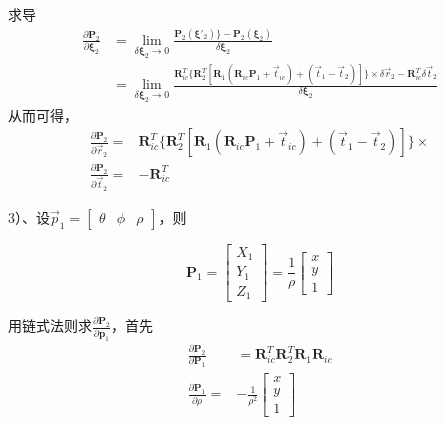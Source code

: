 \documentclass{article}
\begin{document}
求导
\begin{equation}
	\begin{aligned}
		\frac{\partial{\boldsymbol{P}_2}}{\partial{\boldsymbol{\xi}_2}} & = 
		\lim_{\delta\boldsymbol{\xi}_2\rightarrow0}\frac{\boldsymbol{P}_2(\boldsymbol{\xi}'_2)\}-  \boldsymbol{P}_2(\boldsymbol{\xi}_2)}{\delta\boldsymbol{\xi}_2}\\&=
		\lim_{\delta\boldsymbol{\xi}_2\rightarrow0}\frac{\boldsymbol{R}_{ic}^{T}\{\boldsymbol{R}_2^{T}[\boldsymbol{R}_1(\boldsymbol{R}_{ic}\boldsymbol{P}_1+\vec{t}_{ic})+(\vec{t}_1-\vec{t}_2)]\}\times\delta\vec{r}_2 - \boldsymbol{R}_{ic}^{T}\delta\vec{t}_2}{\delta\boldsymbol{\xi}_2}
	\end{aligned}
\end{equation}
从而可得，
\begin{equation}
	\begin{aligned}
		\frac{\partial{\boldsymbol{P}_2}}{\partial{\vec{r}_2}}= & \boldsymbol{R}_{ic}^{T}\{\boldsymbol{R}_2^{T}[\boldsymbol{R}_1(\boldsymbol{R}_{ic}\boldsymbol{P}_1+\vec{t}_{ic})+(\vec{t}_1-\vec{t}_2)]\}\times \\
		\frac{\partial{\boldsymbol{P}_2}}{\partial{\vec{t}_2}}= & -\boldsymbol{R}_{ic}^{T}                                                                                                                        
	\end{aligned}
\end{equation}

3）、设$\vec{p}_1=
\left[
	\begin{matrix} 
		\theta & \phi & \rho 
	\end{matrix}
\right]$，则

\begin{equation}
	\boldsymbol{P}_1=
	\left[\begin{matrix}X_1  \\ 
		Y_1 \\
		Z_1
	\end{matrix}\right]
	=\frac{1}{\rho}  
	\left[
		\begin{matrix}
			x \\
			y \\
			1 
		\end{matrix}
	\right]
\end{equation}

用链式法则求$\frac{\partial{\boldsymbol{P}_2}}{\partial{\boldsymbol{p}_1}}$，首先
\begin{equation}
	\begin {aligned}
	\frac{\partial{\boldsymbol{P}_2}}{\partial{\boldsymbol{P}_1}}&=\boldsymbol{R}_{ic}^{T}\boldsymbol{R}_2^{T}\boldsymbol{R}_1\boldsymbol{R}_{ic}
	\\
	\frac{\partial\boldsymbol{P}_1}{\partial\rho}=&-\frac{1}{\rho^2}
		\left[
			\begin{matrix}
				x\\
				y\\
				1
			\end{matrix}
		\right]
	\end{aligned}
\end{equation}
\end{document}
